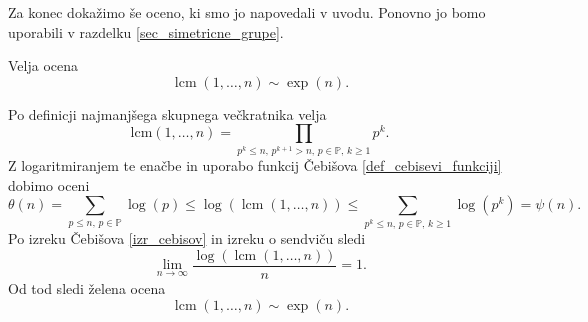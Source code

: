 Za konec dokažimo še oceno, ki smo jo napovedali v uvodu. Ponovno jo bomo uporabili v razdelku \ref{sec_simetricne_grupe}.
\begin{lema}
  \label{lem_lcm_exp_n}
  Velja ocena \begin{equation*}
  \operatorname{lcm}(1, \ldots, n) \sim \exp(n).
  \end{equation*}  
  \end{lema}
  \begin{dokaz}
  Po definicji najmanjšega skupnega večkratnika velja \begin{equation*}
  \text{lcm}(1, \ldots, n) = \prod_{p^{k} \le n, \, p^{k + 1} > n,\,   p \in \mathbb{P}, \, k \ge 1 } p^{k}.
  \end{equation*}  
  Z logaritmiranjem te enačbe in uporabo funkcij Čebišova \ref{def_cebisevi_funkciji} dobimo oceni \begin{equation*}
  \theta(n) = \sum_{p \le n, \,   p \in \mathbb{P}} \log(p) \le \log(\operatorname{lcm}(1, \ldots ,n)) \le  \sum_{p^{k} \le n, \, p \in \mathbb{P}, \, k \ge 1 } \log(p^{k}) = \psi(n).
  \end{equation*}  
  Po izreku Čebišova \ref{izr_cebisov} in izreku o sendviču sledi \begin{equation*}
  \lim_{n \to \infty} \frac{\log(\operatorname{lcm}(1, \ldots, n))}{n} = 1.
  \end{equation*}  
    Od tod sledi želena ocena \begin{equation*}
      \operatorname{lcm}(1, \ldots, n) \sim \exp(n).
  \end{equation*} 
  \end{dokaz}




